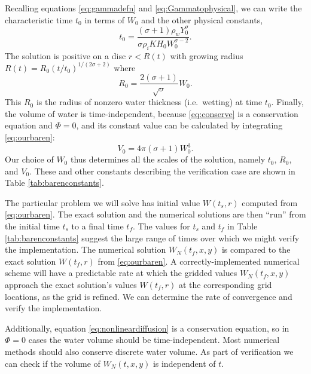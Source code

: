 \documentclass[11pt]{amsart}
\begin{document}
Recalling equations \eqref{eq:gammadefn} and \eqref{eq:Gammatophysical}, we can write the characteristic time $t_0$ in terms of $W_0$ and the other physical constants,
\begin{equation} \label{eq:tzero}
  t_0 = \frac{(\sigma+1) \rho_w Y_0^\sigma}{\sigma \rho_i K H_0 W_0^{\sigma-2}}.
\end{equation}
The solution is positive on a disc $r<R(t)$ with growing radius $R(t)=R_0 (t/t_0)^{1/(2\sigma+2)}$ where
\begin{equation} \label{eq:Rzero}
  R_0 = \frac{2(\sigma+1)}{\sqrt{\sigma}} W_0.
\end{equation}
This $R_0$ is the radius of nonzero water thickness (i.e.~wetting) at time $t_0$.  Finally, the volume of water is time-independent, because \eqref{eq:conserve} is a conservation equation and $\Phi=0$, and its constant value can be calculated by integrating \eqref{eq:ourbaren}:
\begin{equation}\label{eq:Vzero}
V_0 = 4 \pi (\sigma + 1) W_0^3.
\end{equation}
Our choice of $W_0$ thus determines all the scales of the solution, namely  $t_0$, $R_0$, and $V_0$.  These and other constants describing the verification case are shown in Table \ref{tab:barenconstants}.

The particular problem we will solve has initial value $W(t_s,r)$ computed from \eqref{eq:ourbaren}.  The exact solution and the numerical solutions are then ``run'' from the initial time $t_s$ to a final time $t_f$.  The values for $t_s$ and $t_f$ in Table \ref{tab:barenconstants} suggest the large range of times over which we might verify the implementation.  The numerical solution $W_N(t_f,x,y)$ is compared to the exact solution $W(t_f,r)$ from \eqref{eq:ourbaren}.  A correctly-implemented numerical scheme will have a predictable rate at which the gridded values $W_N(t_f,x,y)$ approach the exact solution's values $W(t_f,r)$ at the corresponding grid locations, as the grid is refined.  We can determine the rate of convergence and verify the implementation.

Additionally, equation \eqref{eq:nonlineardiffusion} is a conservation equation, so in $\Phi=0$ cases the water volume should be time-independent.  Most numerical methods should also conserve discrete water volume.  As part of verification we can check if the volume of $W_N(t,x,y)$ is independent of $t$.
\end{document}

